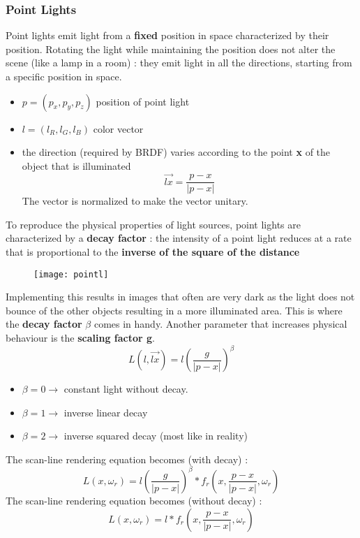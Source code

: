 \subsubsection{Point Lights}
Point lights emit light from a \textbf{fixed} position in space characterized by their position. Rotating the light while maintaining the position does not alter the scene (like a lamp in a room) : they emit light in all the directions, starting from a specific position in space.
\begin{itemize}
\item $p=(p_x,p_y,p_z)$ position of point light
\item $l=(l_R,l_G,l_B)$ color vector
\item the direction (required by BRDF) varies according to the point \textbf{x} of the object that is illuminated  $$ \vec{lx} = \frac{p-x}{|p-x|}$$The vector is normalized to make the vector unitary.
\end{itemize}
To reproduce the physical properties of light sources, point lights are characterized by a \textbf{decay factor} : the intensity of a point light reduces at a rate that is proportional to the\textbf{ inverse of the square of the distance}
\begin{figure}[H]
  \centering
  \texttt{[image: pointl]}
\end{figure}
Implementing this results in images that often are very dark as the light does not bounce of the other objects resulting in a more illuminated area. This is where the \textbf{decay factor} $\beta$ comes in handy. Another parameter that increases physical behaviour is the \textbf{scaling factor g}.
\[
\boxed{L(l,\vec{lx})= l \left( \frac{g}{|p-x|} \right)^{\beta}}
\]
\begin{itemize}
\item $\beta=0 \to$ constant light without decay.
\item $\beta=1 \to$ inverse linear decay
\item $\beta=2 \to$ inverse squared decay (most like in reality) 
\end{itemize}
The scan-line rendering equation becomes (with decay) :
\[
\boxed{L(x,\omega_r)= l \left( \frac{g}{|p-x|} \right)^{\beta} * f_r \left( x, \frac{p-x}{|p-x|},\omega_r \right)}
\]
The scan-line rendering equation becomes (without decay) :
\[
\boxed{L(x,\omega_r)= l* f_r \left( x, \frac{p-x}{|p-x|},\omega_r \right )}
\]

